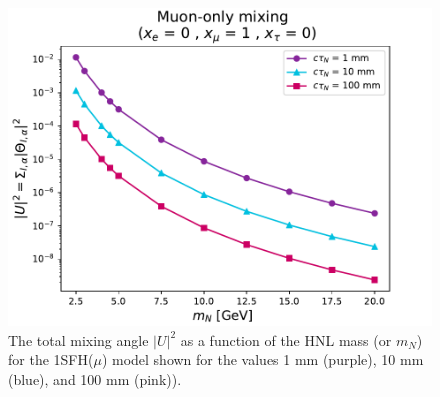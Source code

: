 \begin{figure}[!ht]
    \centering
    \includegraphics[width=.6\textwidth]{figures/theory/theta_Uu.pdf}
    \caption{The total mixing angle $|U|^2$ as a function of the HNL mass (\mhnl or $m_N$) for the 1SFH($\mu$) model shown for the \ctau values 1 mm (purple), 10 mm (blue), and 100 mm (pink)).~\cite{Trischuk:2806047}}
    \label{fig:mixing_angle}
\end{figure}
